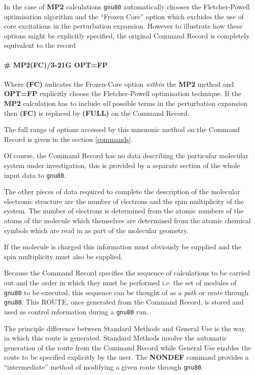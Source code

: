 In the case of {\bf MP2} calculations {\tt gnu80} automatically chooses
the Fletcher-Powell optimisation algorithm and the ``Frozen
Core''  option which excludes the use of core excitations in 
the perturbation expansion. However to illustrate how these options
might be explicitly specified, the original Command Record
is completely equivalent to the record
\\
\vspace{0.5cm}
\\
{\bf \# MP2(FC)/3-21G OPT=FP}
\\
\vspace{0.5cm}
\\
Where {\bf (FC)} indicates the Frozen-Core option {\em within}
the {\bf MP2} method and {\bf OPT=FP} explicitly choose the Fletcher-Powell
optimisation technique. If the {\bf MP2} calculation has to include
{\em all} possible terms in the perturbation expansion then  {\bf (FC)}
is replaced by {\bf (FULL)} on the Command Record.

The full range of options accessed by this mnenonic method on the
Command Record is given in the section \ref{commands}.

Of course, the Command Record has no data describing the
particular molecular system under investigation, this is 
provided by a separate section of the whole input data to {\tt gnu80}.

The other pieces of data required to complete the description of
the molecular electronic structure are the number of electrons
and the spin multiplicity of the system.
The number of electrons is determined from the atomic numbers
of the atoms of the molecule which themselves are determined from
the atomic chemical symbols which are read in as part of the molecular
geometry.

If the molecule is charged this information must obviously be
supplied and the spin multiplicity must also be supplied.

Because the Command Record specifies the sequence
of calculations to be carried out and the order in
which they must be performed i.e. the set of modules
of {\tt gnu80} to be executed, this sequence can be thought of as
a {\em path} or {\em route} through {\tt gnu80}.
This ROUTE, once generated from the Command Record, 
is stored and used as control information during a {\tt gnu80}
run.

The principle difference between Standard Methods and General Use
is the way in which this route is generated. Standard Methods
involve the automatic generation of the route from the
Command Record while General Use enables the route to be
specified explicitly by the user.
The {\bf NONDEF} command provides a ``intermediate''
method of modifying a given route through {\tt gnu80}.


